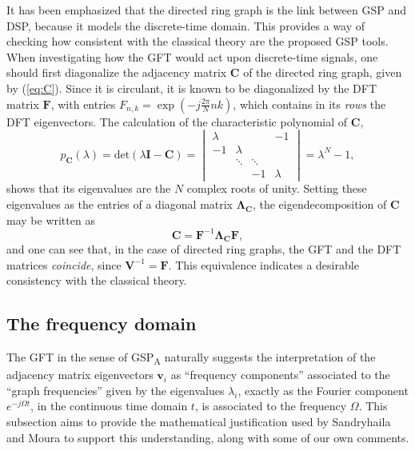 It has been emphasized that the directed ring graph is the link between GSP and DSP, because it models the discrete-time domain. This provides a way of checking how consistent with the classical theory are the proposed GSP tools. When investigating how the GFT would act upon discrete-time signals, one should first diagonalize the adjacency matrix $ \mathbf{C} $ of the directed ring graph, given by (\ref{eq:C}). Since it is circulant, it is known to be diagonalized by the DFT matrix $ \mathbf{F} $, with entries $ F_{n,k} = \exp \left( -j\frac{2 \pi}{N} nk \right) $, which contains in its \emph{rows} the DFT eigenvectors. The calculation of the characteristic polynomial of $ \mathbf{C} $,
\begin{equation}
p_{\mathbf{C}}(\lambda) = \text{det} (\lambda \mathbf{I} - \mathbf{C}) =
\begin{vmatrix}
\lambda &  &  &   -1\\ 
-1 & \lambda &   & \\ 
&   \ddots & \ddots & \\ 
&  &   -1 & \lambda
\end{vmatrix}
=\lambda^N - 1,
\end{equation}
shows that its eigenvalues are the $ N $ complex roots of unity. Setting these eigenvalues as the entries of a diagonal matrix $ \mathbf{\Lambda}_{\mathbf{C}} $, the eigendecomposition of $ \mathbf{C} $ may be written as
\begin{equation}\label{eq:diag_C}
\mathbf{C} = \mathbf{F}^{-1} \mathbf{\Lambda}_{\mathbf{C}} \mathbf{F},
\end{equation}
and one can see that, in the case of directed ring graphs, the GFT and the DFT matrices \emph{coincide}, since $ \mathbf{V}^{-1} = \mathbf{F} $. This equivalence indicates a desirable consistency with the classical theory.

\subsection{The frequency domain}

The GFT in the sense of GSP\textsubscript{A} naturally suggests the interpretation of the adjacency matrix eigenvectors $ \mathbf{v}_i $ as ``frequency components'' associated to the ``graph frequencies'' given by the eigenvalues $ \lambda_i $, exactly as the Fourier component $ e^{-j \Omega t} $, in the continuous time domain $ t $, is associated to the frequency $ \Omega $. This subsection aims to provide the mathematical justification used by Sandryhaila and Moura \cite{sandryhaila2014frequency} to support this understanding, along with some of our own comments.

